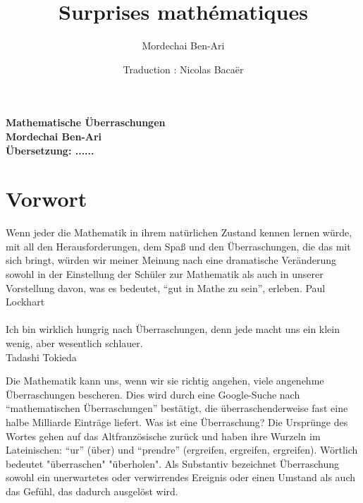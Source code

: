 
\author{Mordechai Ben-Ari}
\title{Surprises mathématiques}
\date{Traduction : Nicolas Bacaër}

\pagestyle{empty}
\begin{center}
\textbf{\huge Mathematische Überraschungen}\\
\vspace{2cm}
\textbf{\Large Mordechai Ben-Ari}\\
\vspace{1cm}
\textbf{\Large Übersetzung: ......}
\end{center}



\chapter*{Vorwort}

\begin{flushright}
\parbox{7cm}{
\begin{footnotesize}
\begin{flushright}
Wenn jeder die Mathematik in ihrem natürlichen Zustand kennen lernen würde, mit all den Herausforderungen, dem Spaß und den Überraschungen, die das mit sich bringt, würden wir meiner Meinung nach eine dramatische Veränderung sowohl in der Einstellung der Schüler zur Mathematik als auch in unserer Vorstellung davon, was es bedeutet, ``gut in Mathe zu sein'', erleben.
Paul Lockhart\mbox{}\\\mbox{}\\
Ich bin wirklich hungrig nach Überraschungen, denn jede macht uns ein klein wenig, aber wesentlich schlauer.\\
Tadashi Tokieda
\end{flushright}
\end{footnotesize}
}
\end{flushright}

\bigskip

Die Mathematik kann uns, wenn wir sie richtig angehen, viele angenehme Überraschungen bescheren. Dies wird durch eine Google-Suche nach ``mathematischen Überraschungen'' bestätigt, die überraschenderweise fast eine halbe Milliarde Einträge liefert. Was ist eine Überraschung? Die Ursprünge des Wortes gehen auf das Altfranzösische zurück und haben ihre Wurzeln im Lateinischen: ``ur'' (über) und ``prendre'' (ergreifen, ergreifen, ergreifen). Wörtlich bedeutet "überraschen" "überholen". Als Substantiv bezeichnet Überraschung sowohl ein unerwartetes oder verwirrendes Ereignis oder einen Umstand als auch das Gefühl, das dadurch ausgelöst wird.

